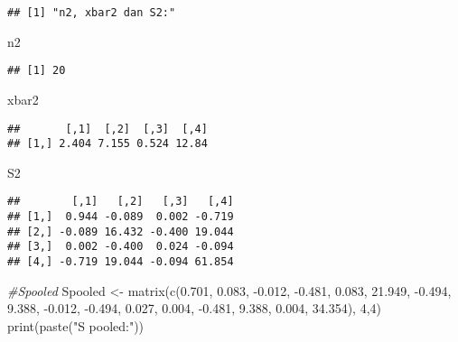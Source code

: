 \documentclass[
]{article}
\newenvironment{Shaded}{\begin{snugshade}}{\end{snugshade}}
\newcommand{\CommentTok}[1]{\textcolor[rgb]{0.56,0.35,0.01}{\textit{#1}}}
\newcommand{\DecValTok}[1]{\textcolor[rgb]{0.00,0.00,0.81}{#1}}
\newcommand{\FloatTok}[1]{\textcolor[rgb]{0.00,0.00,0.81}{#1}}
\newcommand{\FunctionTok}[1]{\textcolor[rgb]{0.00,0.00,0.00}{#1}}
\newcommand{\NormalTok}[1]{#1}
\newcommand{\OtherTok}[1]{\textcolor[rgb]{0.56,0.35,0.01}{#1}}
\newcommand{\SpecialCharTok}[1]{\textcolor[rgb]{0.00,0.00,0.00}{#1}}
\newcommand{\StringTok}[1]{\textcolor[rgb]{0.31,0.60,0.02}{#1}}
\begin{document}
\begin{verbatim}
## [1] "n2, xbar2 dan S2:"
\end{verbatim}

\begin{Shaded}
\begin{Highlighting}[]
\NormalTok{n2}
\end{Highlighting}
\end{Shaded}

\begin{verbatim}
## [1] 20
\end{verbatim}

\begin{Shaded}
\begin{Highlighting}[]
\NormalTok{xbar2}
\end{Highlighting}
\end{Shaded}

\begin{verbatim}
##       [,1]  [,2]  [,3]  [,4]
## [1,] 2.404 7.155 0.524 12.84
\end{verbatim}

\begin{Shaded}
\begin{Highlighting}[]
\NormalTok{S2}
\end{Highlighting}
\end{Shaded}

\begin{verbatim}
##        [,1]   [,2]   [,3]   [,4]
## [1,]  0.944 -0.089  0.002 -0.719
## [2,] -0.089 16.432 -0.400 19.044
## [3,]  0.002 -0.400  0.024 -0.094
## [4,] -0.719 19.044 -0.094 61.854
\end{verbatim}

\begin{Shaded}
\begin{Highlighting}[]
\CommentTok{\#Spooled}
\NormalTok{Spooled }\OtherTok{\textless{}{-}} \FunctionTok{matrix}\NormalTok{(}\FunctionTok{c}\NormalTok{(}\FloatTok{0.701}\NormalTok{, }\FloatTok{0.083}\NormalTok{, }\SpecialCharTok{{-}}\FloatTok{0.012}\NormalTok{, }\SpecialCharTok{{-}}\FloatTok{0.481}\NormalTok{, }\FloatTok{0.083}\NormalTok{, }\FloatTok{21.949}\NormalTok{, }\SpecialCharTok{{-}}\FloatTok{0.494}\NormalTok{, }\FloatTok{9.388}\NormalTok{, }\SpecialCharTok{{-}}\FloatTok{0.012}\NormalTok{, }\SpecialCharTok{{-}}\FloatTok{0.494}\NormalTok{, }\FloatTok{0.027}\NormalTok{, }\FloatTok{0.004}\NormalTok{, }\SpecialCharTok{{-}}\FloatTok{0.481}\NormalTok{, }\FloatTok{9.388}\NormalTok{, }\FloatTok{0.004}\NormalTok{, }\FloatTok{34.354}\NormalTok{), }\DecValTok{4}\NormalTok{,}\DecValTok{4}\NormalTok{)}
\FunctionTok{print}\NormalTok{(}\FunctionTok{paste}\NormalTok{(}\StringTok{"S pooled:"}\NormalTok{))}
\end{Highlighting}
\end{Shaded}
\end{document}
